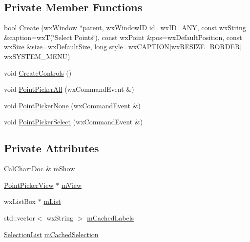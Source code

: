 \subsection*{Private Member Functions}
\begin{DoxyCompactItemize}
\item 
bool \hyperlink{a00114_a1fb0b497332fe9e3043e4452ebded0c7}{Create} (wx\-Window $\ast$parent, wx\-Window\-I\-D id=wx\-I\-D\-\_\-\-A\-N\-Y, const wx\-String \&caption=wx\-T(\char`\"{}Select Points\char`\"{}), const wx\-Point \&pos=wx\-Default\-Position, const wx\-Size \&size=wx\-Default\-Size, long style=wx\-C\-A\-P\-T\-I\-O\-N$\vert$wx\-R\-E\-S\-I\-Z\-E\-\_\-\-B\-O\-R\-D\-E\-R$\vert$wx\-S\-Y\-S\-T\-E\-M\-\_\-\-M\-E\-N\-U)
\item 
void \hyperlink{a00114_a64c6c570e1eeeb0675271e31fd53ac25}{Create\-Controls} ()
\item 
void \hyperlink{a00114_a090f964cf789be0c4764df5a4dc86f35}{Point\-Picker\-All} (wx\-Command\-Event \&)
\item 
void \hyperlink{a00114_aed16bfe7c4a246e181233b17a8e94ccb}{Point\-Picker\-None} (wx\-Command\-Event \&)
\item 
void \hyperlink{a00114_a481e120ef03c512e4da97bb582016362}{Point\-Picker\-Select} (wx\-Command\-Event \&)
\end{DoxyCompactItemize}
\subsection*{Private Attributes}
\begin{DoxyCompactItemize}
\item 
\hyperlink{a00020}{Cal\-Chart\-Doc} \& \hyperlink{a00114_a224de9bc2a9626685431da5faea7e6fa}{m\-Show}
\item 
\hyperlink{a00115}{Point\-Picker\-View} $\ast$ \hyperlink{a00114_a1b4d9baeb354f46b38c675c19cd3cb03}{m\-View}
\item 
wx\-List\-Box $\ast$ \hyperlink{a00114_a3666f53d28030b70780b949a400e40e2}{m\-List}
\item 
std\-::vector$<$ wx\-String $>$ \hyperlink{a00114_a00af7f5a7fe9ff6b76483e049cd9255f}{m\-Cached\-Labels}
\item 
\hyperlink{a00214_aaec86d4bb87e1e6f0b60e6e551c5e570}{Selection\-List} \hyperlink{a00114_a3ca4a604fedbc278b3b62a63e90159c3}{m\-Cached\-Selection}
\end{DoxyCompactItemize}


